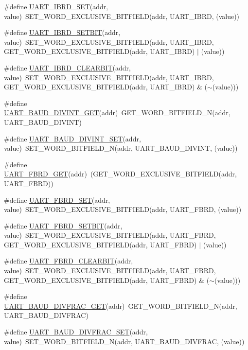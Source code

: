 \begin{DoxyCompactItemize}
\item 
\#define \hyperlink{a00574_a5edf79cd6262923c0d0095b732f1b500}{UART\_\-IBRD\_\-SET}(addr, value)~SET\_\-WORD\_\-EXCLUSIVE\_\-BITFIELD(addr, UART\_\-IBRD, (value))
\item 
\#define \hyperlink{a00574_a76ff208baa443c4ca9ac9be248a31c42}{UART\_\-IBRD\_\-SETBIT}(addr, value)~SET\_\-WORD\_\-EXCLUSIVE\_\-BITFIELD(addr, UART\_\-IBRD, GET\_\-WORD\_\-EXCLUSIVE\_\-BITFIELD(addr, UART\_\-IBRD) $|$ (value))
\item 
\#define \hyperlink{a00574_a2aeaeae5fa01baff2036b2f69a6227b3}{UART\_\-IBRD\_\-CLEARBIT}(addr, value)~SET\_\-WORD\_\-EXCLUSIVE\_\-BITFIELD(addr, UART\_\-IBRD, GET\_\-WORD\_\-EXCLUSIVE\_\-BITFIELD(addr, UART\_\-IBRD) \& ($\sim$(value)))
\item 
\#define \hyperlink{a00574_adaea16bc2af912f2a78969adeb342886}{UART\_\-BAUD\_\-DIVINT\_\-GET}(addr)~GET\_\-WORD\_\-BITFIELD\_\-N(addr, UART\_\-BAUD\_\-DIVINT)
\item 
\#define \hyperlink{a00574_ac43be9df78e43d43af6e496e92ba1f5f}{UART\_\-BAUD\_\-DIVINT\_\-SET}(addr, value)~SET\_\-WORD\_\-BITFIELD\_\-N(addr, UART\_\-BAUD\_\-DIVINT, (value))
\item 
\#define \hyperlink{a00574_a278ed165bc638ea90fe9f4f0608b0935}{UART\_\-FBRD\_\-GET}(addr)~(GET\_\-WORD\_\-EXCLUSIVE\_\-BITFIELD(addr, UART\_\-FBRD))
\item 
\#define \hyperlink{a00574_a6e00dac8fbda5f0be9705fff2411244e}{UART\_\-FBRD\_\-SET}(addr, value)~SET\_\-WORD\_\-EXCLUSIVE\_\-BITFIELD(addr, UART\_\-FBRD, (value))
\item 
\#define \hyperlink{a00574_a14b475e226dfabfa15cb555d869e1430}{UART\_\-FBRD\_\-SETBIT}(addr, value)~SET\_\-WORD\_\-EXCLUSIVE\_\-BITFIELD(addr, UART\_\-FBRD, GET\_\-WORD\_\-EXCLUSIVE\_\-BITFIELD(addr, UART\_\-FBRD) $|$ (value))
\item 
\#define \hyperlink{a00574_a46f19fc1c5d7d7c2c304501c37397ee9}{UART\_\-FBRD\_\-CLEARBIT}(addr, value)~SET\_\-WORD\_\-EXCLUSIVE\_\-BITFIELD(addr, UART\_\-FBRD, GET\_\-WORD\_\-EXCLUSIVE\_\-BITFIELD(addr, UART\_\-FBRD) \& ($\sim$(value)))
\item 
\#define \hyperlink{a00574_a809ff5608d0a4b99fa19b375fa328bd0}{UART\_\-BAUD\_\-DIVFRAC\_\-GET}(addr)~GET\_\-WORD\_\-BITFIELD\_\-N(addr, UART\_\-BAUD\_\-DIVFRAC)
\item 
\#define \hyperlink{a00574_a9afa1a2e58a3ba7a83808c3cda341961}{UART\_\-BAUD\_\-DIVFRAC\_\-SET}(addr, value)~SET\_\-WORD\_\-BITFIELD\_\-N(addr, UART\_\-BAUD\_\-DIVFRAC, (value))
\item 

\end{DoxyCompactItemize}
